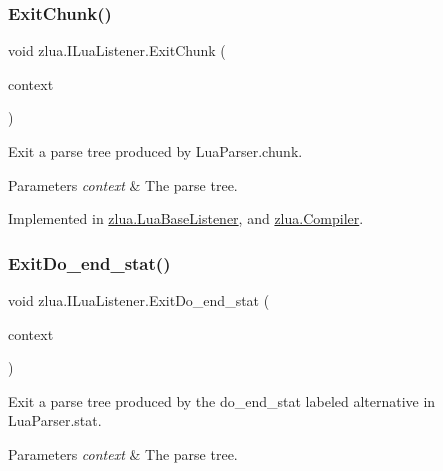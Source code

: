 \subsubsection{\texorpdfstring{Exit\+Chunk()}{ExitChunk()}}
{\footnotesize\ttfamily void zlua.\+I\+Lua\+Listener.\+Exit\+Chunk (\begin{DoxyParamCaption}\item[{\mbox{[}\+Not\+Null\mbox{]} \mbox{\hyperlink{classzlua_1_1_lua_parser_1_1_chunk_context}{Lua\+Parser.\+Chunk\+Context}}}]{context }\end{DoxyParamCaption})}



Exit a parse tree produced by Lua\+Parser.\+chunk. 


\begin{DoxyParams}{Parameters}
{\em context} & The parse tree.\\
\hline
\end{DoxyParams}


Implemented in \mbox{\hyperlink{classzlua_1_1_lua_base_listener_aef4ea05d4f1cf0a5c223da23a2b8a312}{zlua.\+Lua\+Base\+Listener}}, and \mbox{\hyperlink{classzlua_1_1_compiler_a1f313aa9552acb3fa730ac091a4fa17d}{zlua.\+Compiler}}.

\mbox{\label{interfacezlua_1_1_i_lua_listener_a21222197a86ad5c425dcab38204a7840}} 
\subsubsection{\texorpdfstring{Exit\+Do\+\_\+end\+\_\+stat()}{ExitDo\_end\_stat()}}
{\footnotesize\ttfamily void zlua.\+I\+Lua\+Listener.\+Exit\+Do\+\_\+end\+\_\+stat (\begin{DoxyParamCaption}\item[{\mbox{[}\+Not\+Null\mbox{]} \mbox{\hyperlink{classzlua_1_1_lua_parser_1_1_do__end__stat_context}{Lua\+Parser.\+Do\+\_\+end\+\_\+stat\+Context}}}]{context }\end{DoxyParamCaption})}



Exit a parse tree produced by the {\ttfamily do\+\_\+end\+\_\+stat} labeled alternative in Lua\+Parser.\+stat. 


\begin{DoxyParams}{Parameters}
{\em context} & The parse tree.\\
\hline
\end{DoxyParams}


